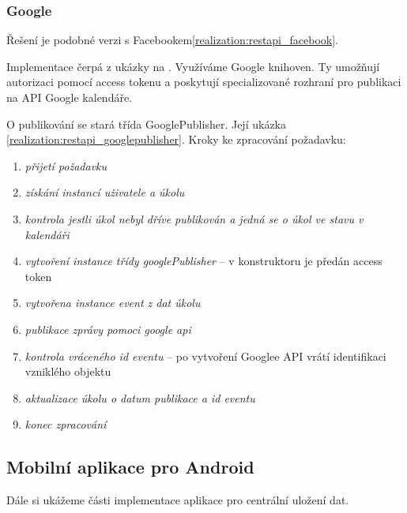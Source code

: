 \documentclass[thesis=B,czech]{FITthesis}[2012/06/26]
\begin{document}


\subsubsection{Google}

Řešení je podobné verzi s Facebookem\ref{realization:restapi_facebook}.

Implementace čerpá z ukázky na \cite{design_google_quickstart}. Využíváme Google knihoven. Ty umožňují autorizaci pomocí access tokenu a poskytují specializované rozhraní pro publikaci na API Google kalendáře.

O publikování se stará třída GooglePublisher. Její ukázka \ref{realization:restapi_googlepublisher}.
\vspace*{1\baselineskip}
\newline
Kroky ke zpracování požadavku:
\begin{enumerate}[nosep]
	\item \textit{přijetí požadavku}
	\item \textit{získání instancí uživatele a úkolu} 
	\item \textit{kontrola jestli úkol nebyl dříve publikován a jedná se o úkol ve stavu v kalendáři}
	\item \textit{vytvoření instance třídy googlePublisher} -- v konstruktoru je předán access token
	\item \textit{vytvořena instance event z dat úkolu} 
	\item \textit{publikace zprávy pomoci google api} 
	\item \textit{kontrola vráceného id eventu} -- po vytvoření Googlee API vrátí identifikaci vzniklého objektu
	\item \textit{aktualizace úkolu o datum publikace a id eventu}
	\item \textit{konec zpracování}
\end{enumerate}





\subsection{Mobilní aplikace pro Android}

Dále si ukážeme části implementace aplikace pro centrální uložení dat.
\end{document}
